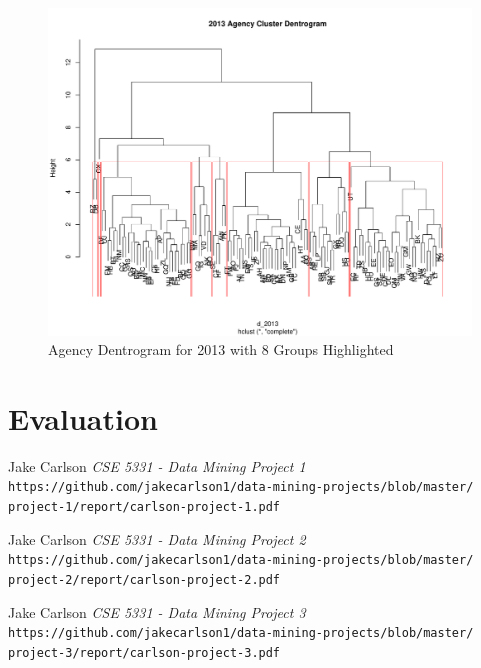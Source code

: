 \documentclass{article}
\begin{document}
    \begin{center}
        \begin{figure}
            \includegraphics[scale=0.4]{./images/2013-dentrogram.pdf}
            \caption{Agency Dentrogram for 2013 with 8 Groups Highlighted}
            \label{fig:6}
        \end{figure}
    \end{center}

\section{Evaluation}

\begin{thebibliography}{10}
    Jake Carlson
    \textit{CSE 5331 - Data Mining Project 1}
    \texttt{https://github.com/jakecarlson1/data-mining-projects/blob/master/}
    \texttt{project-1/report/carlson-project-1.pdf}

    Jake Carlson
    \textit{CSE 5331 - Data Mining Project 2}
    \texttt{https://github.com/jakecarlson1/data-mining-projects/blob/master/}
    \texttt{project-2/report/carlson-project-2.pdf}

    Jake Carlson
    \textit{CSE 5331 - Data Mining Project 3}
    \texttt{https://github.com/jakecarlson1/data-mining-projects/blob/master/}
    \texttt{project-3/report/carlson-project-3.pdf}

\end{thebibliography}
\end{document}
